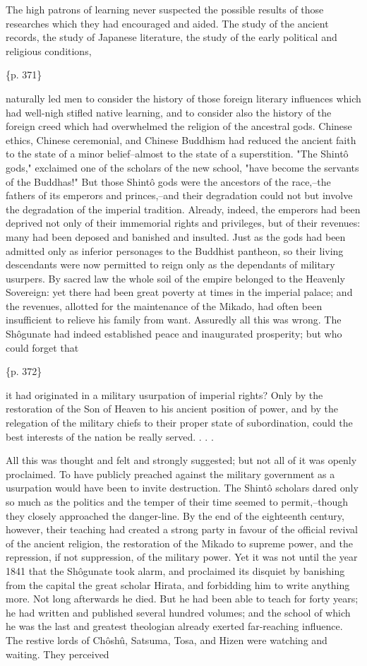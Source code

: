 The high patrons of learning never suspected the possible results of those researches which they had encouraged and aided. The study of the ancient records, the study of Japanese literature, the study of the early political and religious conditions,

\{p. 371\}

naturally led men to consider the history of those foreign literary influences which had well-nigh stifled native learning, and to consider also the history of the foreign creed which had overwhelmed the religion of the ancestral gods. Chinese ethics, Chinese ceremonial, and Chinese Buddhism had reduced the ancient faith to the state of a minor belief--almost to the state of a superstition. "The Shintô gods," exclaimed one of the scholars of the new school, "have become the servants of the Buddhas!" But those Shintô gods were the ancestors of the race,--the fathers of its emperors and princes,--and their degradation could not but involve the degradation of the imperial tradition. Already, indeed, the emperors had been deprived not only of their immemorial rights and privileges, but of their revenues: many had been deposed and banished and insulted. Just as the gods had been admitted only as inferior personages to the Buddhist pantheon, so their living descendants were now permitted to reign only as the dependants of military usurpers. By sacred law the whole soil of the empire belonged to the Heavenly Sovereign: yet there had been great poverty at times in the imperial palace; and the revenues, allotted for the maintenance of the Mikado, had often been insufficient to relieve his family from want. Assuredly all this was wrong. The Shôgunate had indeed established peace and inaugurated prosperity; but who could forget that

\{p. 372\}

it had originated in a military usurpation of imperial rights? Only by the restoration of the Son of Heaven to his ancient position of power, and by the relegation of the military chiefs to their proper state of subordination, could the best interests of the nation be really served. . . .

All this was thought and felt and strongly suggested; but not all of it was openly proclaimed. To have publicly preached against the military government as a usurpation would have been to invite destruction. The Shintô scholars dared only so much as the politics and the temper of their time seemed to permit,--though they closely approached the danger-line. By the end of the eighteenth century, however, their teaching had created a strong party in favour of the official revival of the ancient religion, the restoration of the Mikado to supreme power, and the repression, if not suppression, of the military power. Yet it was not until the year 1841 that the Shôgunate took alarm, and proclaimed its disquiet by banishing from the capital the great scholar Hirata, and forbidding him to write anything more. Not long afterwards he died. But he had been able to teach for forty years; he had written and published several hundred volumes; and the school of which he was the last and greatest theologian already exerted far-reaching influence. The restive lords of Chôshû, Satsuma, Tosa, and Hizen were watching and waiting. They perceived

